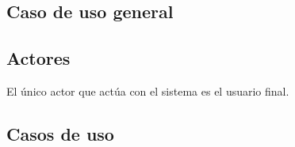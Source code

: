 \subsection{Caso de uso general}


\subsection{Actores}

El único  actor que actúa con el sistema es el usuario final.

\subsection{Casos de uso}


